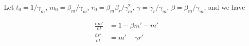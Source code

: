\documentclass{ucetd}
\begin{document}
\begin{appendices}
Let $t_{0} = 1/\gamma_{m}$, $m_{0} = \beta_{m}/\gamma_{m}$, $r_{0} = \beta_{m}\beta_{r}/\gamma_{m}^{2}$, $\gamma = \gamma_{r}/\gamma_{m}$, $\beta = \beta_{m}/\gamma_{m}$, and we have

\begin{align}
\frac{\mathrm{d}m'}{\mathrm{d}t} &= 1 - \beta m' - m'\\
\frac{\mathrm{d}r'}{\mathrm{d}t} &= m' - \gamma r'\\
\end{align}





\end{appendices}
\end{document}
